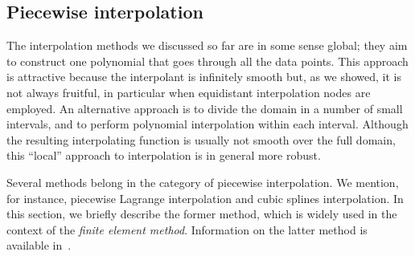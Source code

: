 \subsection{Piecewise interpolation}
\label{sub:piecewise_interpolation}
The interpolation methods we discussed so far are in some sense global;
they aim to construct one polynomial that goes through all the data points.
This approach is attractive because the interpolant is infinitely smooth but,
as we showed, it is not always fruitful,
in particular when equidistant interpolation nodes are employed.
An alternative approach is to divide the domain in a number of small intervals,
and to perform polynomial interpolation within each interval.
Although the resulting interpolating function is usually not smooth over the full domain,
this ``local'' approach to interpolation is in general more robust.

Several methods belong in the category of piecewise interpolation.
We mention, for instance, piecewise Lagrange interpolation and cubic splines interpolation.
In this section,
we briefly describe the former method,
which is widely used in the context of the \emph{finite element method}.
Information on the latter method is available in~\cite[Section 8.7.1.]{MR2265914}.

